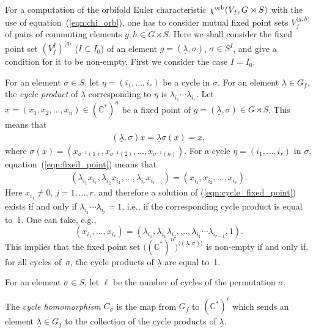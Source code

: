 For a computation of the orbifold Euler characteristic ${\chi}^{\rm orb}(V_f, G \rtimes S)$ with the use of
equation~(\ref{eqn:chi_orb}), one has to consider mutual fixed point sets $V_f^{\langle g,h\rangle}$ of pairs of
commuting elements $g, h\in G \rtimes S$. Here we shall consider the fixed point set
$(V_f^I)^{\langle g\rangle}$ ($I\subset I_0$) of an element $g=(\underline{\lambda}, \sigma)$, $\sigma \in S^I$,
and give a condition for it to be non-empty. First we consider the case $I=I_0$.

For an element $\sigma\in S$, let $\eta=(i_1,\dots, i_r)$ be a cycle in $\sigma$. For an element
$\underline{\lambda}\in G_f$, the {\em cycle product} of $\underline{\lambda}$ corresponding to $\eta$ is
$\lambda_{i_1}\cdots \lambda_{i_r}$. Let $\underline{x}=(x_1, x_2,\dots, x_n)\in ({\mathbb C}^*)^n$ be a fixed point of $g=(\underline{\lambda}, \sigma)\in G \rtimes S$. This means that
\begin{gather}\label{eqn:fixed_point}
(\underline{\lambda}, \sigma)\underline{x}=\underline{\lambda}\sigma(\underline{x})=\underline{x} ,
\end{gather}
where $\sigma(\underline{x})=(x_{\sigma^{-1}(1)}, x_{\sigma^{-1}(2)},\dots, x_{\sigma^{-1}(n)})$.
For a cycle $\eta=(i_1,\dots, i_r)$ in $\sigma$, equation~(\ref{eqn:fixed_point}) means that
\begin{gather}\label{eqn:cycle_fixed_point}
(\lambda_{i_1}x_{i_r}, \lambda_{i_2}x_{i_1},\dots, \lambda_{i_r}x_{i_{r-1}})=(x_{i_1}, x_{i_2},\dots, x_{i_r}) .
\end{gather}
Here $x_{i_j} \neq 0$, $j=1, \dots , r$, and therefore a solution of (\ref{eqn:cycle_fixed_point}) exists if and only if $\lambda_{i_1} \cdots \lambda_{i_r}=1$, i.e., if the corresponding cycle product is equal to~1. One can take, e.g.,
\[
(x_{i_1}, \dots , x_{i_r})=
(\lambda_{i_1}, \lambda_{i_1}\lambda_{i_2}, \dots , \lambda_{i_1} \cdots \lambda_{i_{r-1}},1).
\]
This implies that the fixed point set $\big(({\mathbb C}^*)^n\big)^{\langle (\underline{\lambda},\sigma) \rangle}$ is non-empty if and only if, for all cycles of~$\sigma$, the cycle products of $\underline{\lambda}$ are equal to~1.

For an element $\sigma \in S$, let $\ell$ be the number of cycles of the permutation $\sigma$.

\begin{Definition} The {\em cycle homomorphism} $C_\sigma$ is the map from $G_f$ to $({\mathbb C}^*)^\ell$ which sends an element $\underline{\lambda} \in G_f$ to the collection of the cycle products of $\underline{\lambda}$.
\end{Definition}

